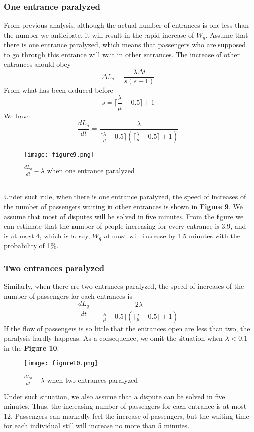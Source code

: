 \documentclass{mcmthesis}
\begin{document}
	\subsubsection{One entrance paralyzed}
	From previous analysis, although the actual number of entrances is one less than the number we anticipate, it will result in the rapid increase of $W_q$. Assume that there is one entrance paralyzed, which means that passengers who are supposed to go through this entrance will wait in other entrances. The increase of other entrances should obey
	$$\Delta L_q=\frac{\lambda\Delta t}{s(s-1)}$$
	From what has been deduced before
	$$s=\lceil\frac{\lambda}{\mu}-0.5\rceil+1$$
	We have
	$$\frac{dL_q}{dt}=\frac{\lambda}{\lceil\frac{\lambda}{\mu}-0.5\rceil(\lceil\frac{\lambda}{\mu}-0.5\rceil +1)}$$
	\begin{figure}[h]
		\small
		\centering
		\texttt{[image: figure9.png]}
		\caption{$\frac{dL_q}{dt}-\lambda$ when one entrance paralyzed} \label{fig:9}
	\end{figure}\\
	Under such rule, when there is one entrance paralyzed, the speed of increases of the number of passengers waiting in other entrances is shown in \textbf{Figure 9}. We assume that most of disputes will be solved in five minutes. From the figure we can estimate that the number of people increasing for every entrance is 3.9, and is at most 4, which is to say, $W_q$ at most will increase by 1.5 minutes with the probability of 1\%.
	\subsubsection{Two entrances paralyzed}
	Similarly, when there are two entrances paralyzed, the speed of increases of the number of passengers for each entrances is
	$$\frac{dL_q}{dt}=\frac{2\lambda}{\lceil\frac{\lambda}{\mu}-0.5\rceil(\lceil\frac{\lambda}{\mu}-0.5\rceil +1)}$$
	If the flow of passengers is so little that the entrances open are less than two, the paralysis hardly happens. As a consequence, we omit the situation when $\lambda<0.1$ in the \textbf{Figure 10}.
	\begin{figure}[h]
		\small
		\centering
		\texttt{[image: figure10.png]}
		\caption{$\frac{dL_q}{dt}-\lambda$ when two entrances paralyzed} \label{fig:10}
	\end{figure}
	Under such situation, we also assume that a dispute can be solved in five minutes. Thus, the increasing number of passengers for each entrance is at most 12. Passengers can markedly feel the increase of passengers, but the waiting time for each individual still will increase no more than 5 minutes.
	
\end{document}
